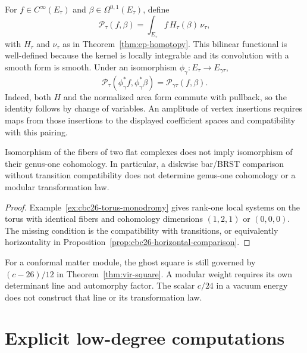 \begin{example}
For $f\in C^\infty(E_\tau)$ and $\beta\in\Omega^{0,1}(E_\tau)$, define
\[
 \mathcal P_\tau(f,\beta)=\int_{E_\tau}f\,H_\tau(\beta)\,\nu_\tau,
\]
with $H_\tau$ and $\nu_\tau$ as in Theorem~\ref{thm:ep-homotopy}.
This bilinear functional is well-defined because the kernel is locally integrable and its convolution with a smooth form is smooth.
Under an isomorphism $\phi_\gamma:E_\tau\to E_{\gamma\tau}$,
\[
 \mathcal P_\tau(\phi_\gamma^*f,\phi_\gamma^*\beta)
 =\mathcal P_{\gamma\tau}(f,\beta).
\]
Indeed, both $H$ and the normalized area form commute with pullback, so the identity follows by change of variables.
An amplitude of vertex insertions requires maps from those insertions to the displayed coefficient spaces and compatibility with this pairing.
\end{example}





\begin{proposition}
\label{thm:modular-anomaly-km-w}
Isomorphism of the fibers of two flat complexes does not imply isomorphism of their genus-one cohomology.
In particular, a diskwise bar/BRST comparison without transition compatibility does not determine genus-one cohomology or a modular transformation law.
\end{proposition}

\begin{proof}
Example~\ref{ex:cbc26-torus-monodromy} gives rank-one local systems on the torus with identical fibers and cohomology dimensions $(1,2,1)$ or $(0,0,0)$.
The missing condition is the compatibility with transitions, or equivalently horizontality in Proposition~\ref{prop:cbc26-horizontal-comparison}.
\end{proof}

For a conformal matter module, the ghost square is still governed by $(c-26)/12$ in Theorem~\ref{thm:vir-square}.
A modular weight requires its own determinant line and automorphy factor.
The scalar $c/24$ in a vacuum energy does not construct that line or its transformation law.


\section{Explicit low-degree computations}
\label{sec:explicit-low-degree}

